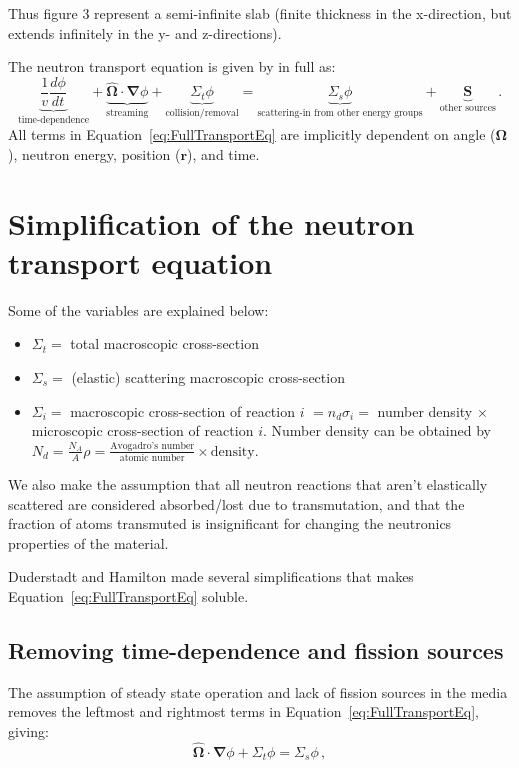 \documentclass[a4paper, 12pt]{article}
\newcommand{\ve}[1]{\boldsymbol{#1}}
\begin{document}
Thus figure 3 represent a semi-infinite slab (finite thickness in the x-direction, but extends infinitely in the y- and z-directions).

The neutron transport equation is given by \cite{Duderstadt} in full as:
\begin{equation}\label{eq:FullTransportEq}
    \underbrace{\frac{1}{v}\frac{d\phi}{dt}}_{\text{time-dependence}} +
    \underbrace{\hat{\ve{\Omega}}\cdot\ve{\nabla}\phi}_{\text{streaming}} +
    \underbrace{\Sigma_t \phi}_{\text{collision/removal}} =
    \underbrace{\Sigma_s \phi}_{\text{scattering-in from other energy groups}} +
    \underbrace{\ve{S}}_{\text{other sources}}\,.
\end{equation}
All terms in Equation~\ref{eq:FullTransportEq} are implicitly dependent on angle ($\ve{\Omega}$), neutron energy, position ($\ve{r}$), and time.

\section{Simplification of the neutron transport equation}
Some of the variables are explained below:
\begin{itemize}
    \item $\Sigma_t = $ total macroscopic cross-section
    \item $\Sigma_s = $ (elastic) scattering macroscopic cross-section
    \item $\Sigma_i = $ macroscopic cross-section of reaction $i$ $= n_d \sigma_i = $ number density $\times$ microscopic cross-section of reaction $i$. Number density can be obtained by $N_d=\frac{N_A}{A}\rho=\frac{\text{Avogadro's number}}{\text{atomic number}}\times\text{density}$.
\end{itemize}

We also make the assumption that all neutron reactions that aren't elastically scattered are considered absorbed/lost due to transmutation, and that the fraction of atoms transmuted is insignificant for changing the neutronics properties of the material.

Duderstadt and Hamilton made several simplifications that makes Equation~\ref{eq:FullTransportEq} soluble.

\subsection{Removing time-dependence and fission sources}
The assumption of steady state operation and lack of fission sources in the media removes the leftmost and rightmost terms in Equation~\ref{eq:FullTransportEq}, giving:
\begin{equation}\label{eq:TransportEq3Terms}
    \hat{\ve{\Omega}}\cdot\ve{\nabla}\phi + \Sigma_t \phi =\Sigma_s \phi\,,
\end{equation}
\end{document}
